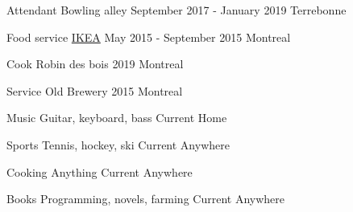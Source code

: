 



\begin{cvhonors}

  \cvhonor
    {Attendant} %
    {Bowling alley} %
    {September 2017 - January 2019} %
    {Terrebonne} %

  \cvhonor
    {Food service} %
    {\href{https://www.ikea.ca/}{IKEA}} %
    {May 2015 - September 2015} %
    {Montreal} %

\end{cvhonors}



\begin{cvhonors}
  \cvhonor
    {Cook} %
    {Robin des bois} %
    {2019} %
    {Montreal} %

  \cvhonor
    {Service} %
    {Old Brewery} %
    {2015} %
    {Montreal} %

\end{cvhonors}



\begin{cvhonors}
  \cvhonor
    {Music} %
    {Guitar, keyboard, bass} %
    {Current} %
    {Home} %

  \cvhonor
    {Sports} %
    {Tennis, hockey, ski} %
    {Current} %
    {Anywhere} %

  \cvhonor
    {Cooking} %
    {Anything} %
    {Current} %
    {Anywhere} %

  \cvhonor
    {Books} %
    {Programming, novels, farming} %
    {Current} %
    {Anywhere} %
\end{cvhonors}
